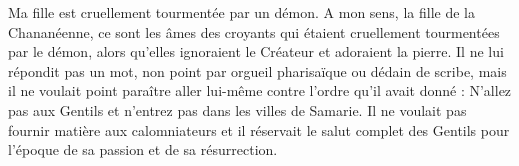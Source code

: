 Ma fille est cruellement tourmentée par un démon. A mon sens, la fille de la Chananéenne, ce sont les âmes des croyants qui étaient cruellement tourmentées par le démon, alors qu’elles ignoraient le Créateur et adoraient la pierre. Il ne lui répondit pas un mot, non point par orgueil pharisaïque ou dédain de scribe, mais il ne voulait point paraître aller lui-même contre l’ordre qu’il avait donné : N’allez pas aux Gentils et n’entrez pas dans les villes de Samarie. Il ne voulait pas fournir matière aux calomniateurs et il réservait le salut complet des Gentils pour l’époque de sa passion et de sa résurrection.
